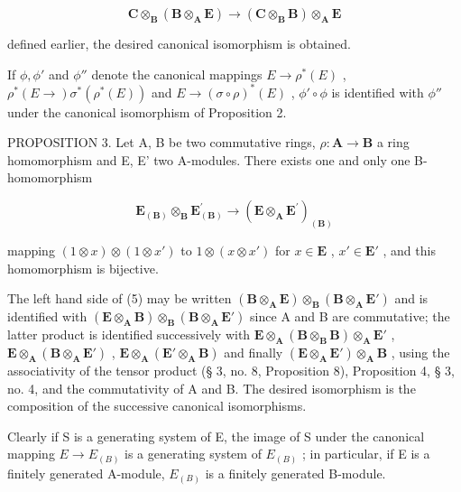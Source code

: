 \[
\mathbf {C} \otimes_ {\mathbf {B}} (\mathbf {B} \otimes_ {\mathbf {A}} \mathbf {E}) \rightarrow (\mathbf {C} \otimes_ {\mathbf {B}} \mathbf {B}) \otimes_ {\mathbf {A}} \mathbf {E}
\]

defined earlier, the desired canonical isomorphism is obtained.

If \(\phi, \phi'\) and \(\phi''\) denote the canonical mappings \(E \to \rho^*(E)\) , \(\rho^*(E \to) \sigma^*(\rho^*(E))\) and \(E \to (\sigma \circ \rho)^*(E)\) , \(\phi' \circ \phi\) is identified with \(\phi''\) under the canonical isomorphism of Proposition 2.

PROPOSITION 3. Let A, B be two commutative rings, \(\rho: \mathbf{A} \to \mathbf{B}\) a ring homomorphism and E, E' two A-modules. There exists one and only one B-homomorphism

\[
\mathbf {E} _ {(\mathbf {B})} \otimes_ {\mathbf {B}} \mathbf {E} _ {(\mathbf {B})} ^ {\prime} \rightarrow (\mathbf {E} \otimes_ {\mathbf {A}} \mathbf {E} ^ {\prime}) _ {(\mathbf {B})}\tag{5}
\]

mapping \((1 \otimes x) \otimes (1 \otimes x')\) to \(1 \otimes (x \otimes x')\) for \(x \in \mathbf{E}\) , \(x' \in \mathbf{E}'\) , and this homomorphism is bijective.

The left hand side of (5) may be written \((\mathbf{B} \otimes_{\mathbf{A}} \mathbf{E}) \otimes_{\mathbf{B}} (\mathbf{B} \otimes_{\mathbf{A}} \mathbf{E}')\) and is identified with \((\mathbf{E} \otimes_{\mathbf{A}} \mathbf{B}) \otimes_{\mathbf{B}} (\mathbf{B} \otimes_{\mathbf{A}} \mathbf{E}')\) since A and B are commutative; the latter product is identified successively with \(\mathbf{E} \otimes_{\mathbf{A}} (\mathbf{B} \otimes_{\mathbf{B}} \mathbf{B}) \otimes_{\mathbf{A}} \mathbf{E}'\) , \(\mathbf{E} \otimes_{\mathbf{A}} (\mathbf{B} \otimes_{\mathbf{A}} \mathbf{E}')\) , \(\mathbf{E} \otimes_{\mathbf{A}} (\mathbf{E}' \otimes_{\mathbf{A}} \mathbf{B})\) and finally \((\mathbf{E} \otimes_{\mathbf{A}} \mathbf{E}') \otimes_{\mathbf{A}} \mathbf{B}\) , using the associativity of the tensor product (§ 3, no. 8, Proposition 8), Proposition 4, § 3, no. 4, and the commutativity of A and B. The desired isomorphism is the composition of the successive canonical isomorphisms.

Clearly if S is a generating system of E, the image of S under the canonical mapping \(E \rightarrow E_{(B)}\) is a generating system of \(E_{(B)}\) ; in particular, if E is a finitely generated A-module, \(E_{(B)}\) is a finitely generated B-module.

